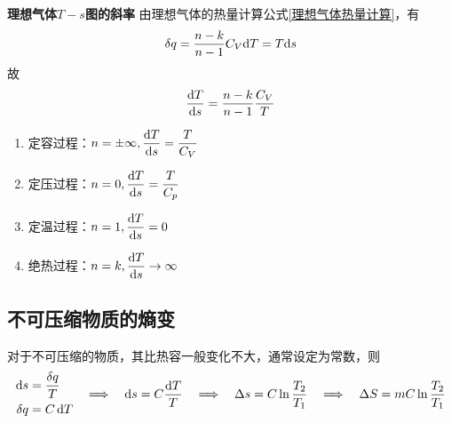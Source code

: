\begin{table}[!htb]
	\centering{}
\end{table}

\noindent \textbf{理想气体$T-s$图的斜率}
由理想气体的热量计算公式\eqref{理想气体热量计算}，有
\begin{align*}
	\delta q = \dfrac{n - k}{n - 1}C_V{\rm{d}} T = T {\rm{d}} s
\end{align*}
故
\begin{align}
	\dfrac{{\rm{d}} T}{{\rm{d}} s} = \dfrac{n - k}{n - 1} \dfrac{C_V}{T}
\end{align}
\begin{enumerate}[(1) ]
	\item 定容过程：$n=\pm \infty, \dfrac{{\rm{d}} T}{{\rm{d}} s} = \dfrac{T}{C_V} $
	\item 定压过程：$n=0, \dfrac{{\rm{d}} T}{{\rm{d}} s} = \dfrac{T}{C_p} $
	\item 定温过程：$n=1, \dfrac{{\rm{d}} T}{{\rm{d}} s} = 0 $
	\item 绝热过程：$n=k, \dfrac{{\rm{d}} T}{{\rm{d}} s} \to \infty $
\end{enumerate}

\subsection{不可压缩物质的熵变}
对于不可压缩的物质，其比热容一般变化不大，通常设定为常数，则
\begin{align*}
	\begin{aligned}
		{\rm{d}} s &= \dfrac{\delta q}{T}\\
		\delta q &= C\,{\rm{d}} T 
	\end{aligned}
	\quad \Longrightarrow \quad {\rm{d}} s = C \dfrac{{\rm{d}} T}{T} 
	\quad \Longrightarrow \quad \Delta s = C \ln \dfrac{T_2}{T_1} 
	\quad \Longrightarrow \quad \Delta S = m C \ln \dfrac{T_2}{T_1} 
\end{align*}

